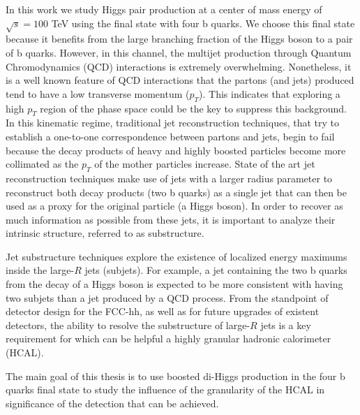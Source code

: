 In this work we study Higgs pair production at a center of mass energy of $\sqrt{s}=100$ TeV using the final state with four b quarks. We choose this final state because it benefits from the large branching fraction of the Higgs boson to a pair of b quarks. However, in this channel, the multijet production through Quantum Chromodynamics (QCD) interactions is extremely overwhelming. Nonetheless, it is a well known feature of QCD interactions that the partons (and jets) produced tend to have a low transverse momentum ($p_T$). This indicates that exploring a high $p_T$ region of the phase space could be the key to suppress this background. In this kinematic regime, traditional jet reconstruction techniques, that try to establish a one-to-one correspondence between partons and jets, begin to fail because the decay products of heavy and highly boosted particles become more collimated as the $p_T$ of the mother particles increase. State of the art jet reconstruction techniques make use of jets with a larger radius parameter to reconstruct both decay products (two b quarks) as a single jet that can then be used as a proxy for the original particle (a Higgs boson). In order to recover as much information as possible from these jets, it is important to analyze their intrinsic structure, referred to as substructure. 

Jet substructure techniques explore the existence of localized energy maximums inside the large-$R$ jets (subjets). For example, a jet containing the two b quarks from the decay of a Higgs boson is expected to be more consistent with having two subjets than a jet produced by a QCD process. From the standpoint of detector design for the FCC-hh, as well as for future upgrades of existent detectors, the ability to resolve the substructure of large-$R$ jets is a key requirement for which can be helpful a highly granular hadronic calorimeter (HCAL).

The main goal of this thesis is to use boosted di-Higgs production in the four b quarks final state to study the influence of the granularity of the HCAL in significance of the detection that can be achieved.


